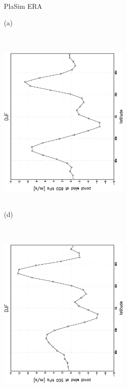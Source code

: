 \documentclass[12pt,a4paper,twoside,openright,headinclude,liststotoc,bibtotoc]{scrreprt}
\begin{document}
\begin{appendix}
\begin{figure}[b]
\hspace{4.0cm}PlaSim \vspace{0.2cm} \hspace{7.3cm} ERA \\
\parbox{8.5cm}{\hspace{0.90cm}\begin{scriptsize}(a) \end{scriptsize} \vspace{-0.5cm} \\
\includegraphics[height=8.5cm,width=6.5cm,angle=-90]
{eps/zonysmu_850DJF.eps}
}
\parbox{8.5cm}{\hspace{0.90cm}\begin{scriptsize}(d) \end{scriptsize} \vspace{-0.5cm} \\
\includegraphics[height=8.5cm,width=6.5cm,angle=-90]
{eps/t21zonysmuvel131DJF850.eps}
}
\end{figure}
\end{appendix}
\end{document}
